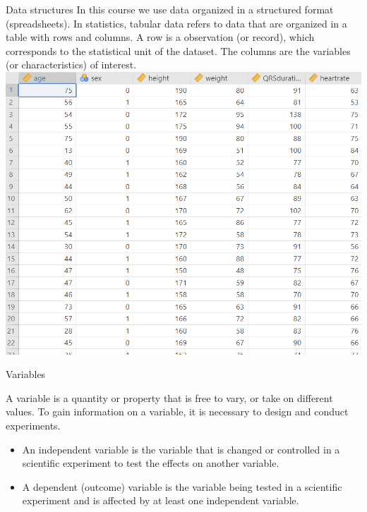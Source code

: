 \documentclass[
  ignorenonframetext,
]{beamer}
\begin{document}
\begin{frame}{Data structures}
In this course we use data organized in a {structured format
(spreadsheets)}. In statistics, tabular data refers to data that are
organized in a table with rows and columns. A {row} is a observation (or
record), which corresponds to the statistical unit of the dataset. The
{columns} are the variables (or characteristics) of interest.
\includegraphics{images_slides/dat.png}
\end{frame}

\begin{frame}{Variables}
\protect\hypertarget{variables}{}
\begin{tcolorbox}[enhanced jigsaw, colframe=quarto-callout-tip-color-frame, colback=white, rightrule=.15mm, opacitybacktitle=0.6, opacityback=0, toprule=.15mm, breakable, colbacktitle=quarto-callout-tip-color!10!white, bottomtitle=1mm, bottomrule=.15mm, title={Variable}, left=2mm, toptitle=1mm, titlerule=0mm, coltitle=black, arc=.35mm, leftrule=.75mm]
A {variable} is a quantity or property that is free to vary, or take on
different values. To gain information on a variable, it is necessary to
design and conduct experiments.
\end{tcolorbox}

\begin{itemize}[<+->]
\item
  An {independent} variable is the variable that is {changed} or
  {controlled} in a scientific experiment to test the effects on another
  variable.
\item
  A {dependent (outcome)} variable is {the variable being tested} in a
  scientific experiment and is affected by at least one independent
  variable.
\end{itemize}
\end{frame}
\end{document}

